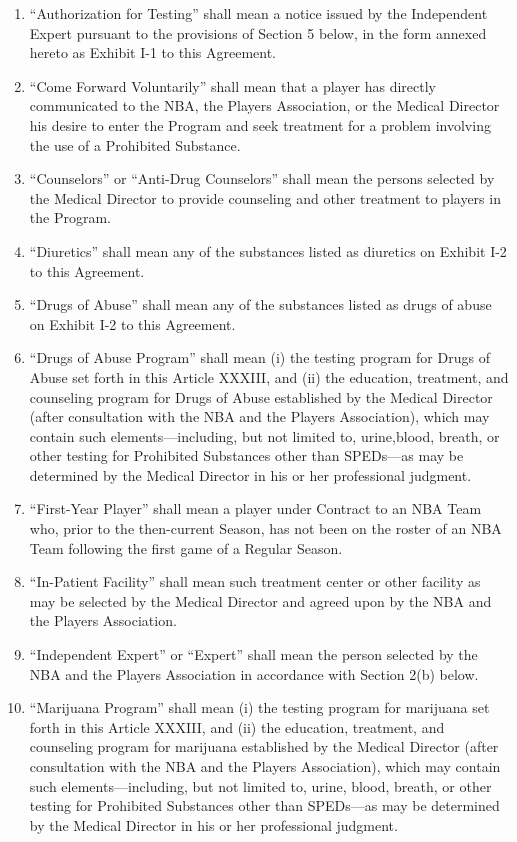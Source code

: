 \documentclass[
]{book}
\providecommand{\tightlist}{%
  \setlength{\itemsep}{0pt}\setlength{\parskip}{0pt}}
\begin{document}
\begin{enumerate}
\def\labelenumi{(\alph{enumi})}
\tightlist
\item
  ``Authorization for Testing'' shall mean a notice issued by the Independent Expert pursuant to the provisions of Section 5 below, in the form annexed hereto as Exhibit I-1 to this Agreement.
\item
  ``Come Forward Voluntarily'' shall mean that a player has directly communicated to the NBA, the Players Association, or the Medical Director his desire to enter the Program and seek treatment for a problem involving the use of a Prohibited Substance.
\item
  ``Counselors'' or ``Anti-Drug Counselors'' shall mean the persons selected by the Medical Director to provide counseling and other treatment to players in the Program.
\item
  ``Diuretics'' shall mean any of the substances listed as diuretics on Exhibit I-2 to this Agreement.
\item
  ``Drugs of Abuse'' shall mean any of the substances listed as drugs of abuse on Exhibit I-2 to this Agreement.
\item
  ``Drugs of Abuse Program'' shall mean (i) the testing program for Drugs of Abuse set forth in this Article XXXIII, and (ii) the education, treatment, and counseling program for Drugs of Abuse established by the Medical Director (after consultation with the NBA and the Players Association), which may contain such elements---including, but not limited to, urine,blood, breath, or other testing for Prohibited Substances other than SPEDs---as may be determined by the Medical Director in his or her professional judgment.
\item
  ``First-Year Player'' shall mean a player under Contract to an NBA Team who, prior to the then-current Season, has not been on the roster of an NBA Team following the first game of a Regular Season.
\item
  ``In-Patient Facility'' shall mean such treatment center or other facility as may be selected by the Medical Director and agreed upon by the NBA and the Players Association.
\item
  ``Independent Expert'' or ``Expert'' shall mean the person selected by the NBA and the Players Association in accordance with Section 2(b) below.
\item
  ``Marijuana Program'' shall mean (i) the testing program for marijuana set forth in this Article XXXIII, and (ii) the education, treatment, and counseling program for marijuana established by the Medical Director (after consultation with the NBA and the Players Association), which may contain such elements---including, but not limited to, urine, blood, breath, or other testing for Prohibited Substances other than SPEDs---as may be determined by the Medical Director in his or her professional judgment.

\end{enumerate}
\end{document}
